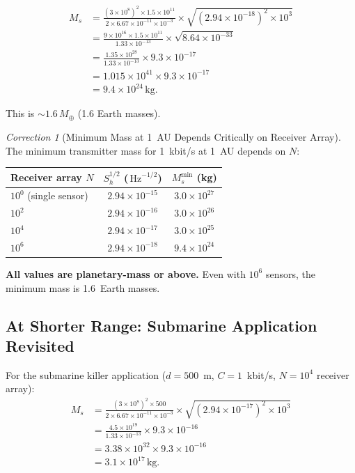 \documentclass[11pt]{article}
\theoremstyle{definition}
\theoremstyle{remark}
\newtheorem{correction}[theorem]{Correction}
\newcommand{\ee}[1]{\times10^{#1}}
\newcommand{\sqrtHz}{\,\mathrm{Hz}^{-1/2}}
\begin{document}
\begin{align}
M_s &= \frac{(3\ee{8})^2 \times 1.5\ee{11}}{2 \times 6.67\ee{-11} \times 10^{-3}}
\times \sqrt{(2.94\ee{-18})^2 \times 10^3} \nonumber\\
&= \frac{9\ee{16} \times 1.5\ee{11}}{1.33\ee{-13}}
\times \sqrt{8.64\ee{-33}} \nonumber\\
&= \frac{1.35\ee{28}}{1.33\ee{-13}}
\times 9.3\ee{-17} \nonumber\\
&= 1.015\ee{41} \times 9.3\ee{-17} \nonumber\\
&= 9.4\ee{24}\,\mathrm{kg}.
\label{eq:M-min-numerical}
\end{align}

This is $\sim 1.6\,M_\oplus$ (1.6 Earth masses).

\begin{correction}[Minimum Mass at 1~AU Depends Critically on Receiver Array]
\label{corr:mass-1AU}
The minimum transmitter mass for 1~kbit/s at 1~AU depends on $N$:

\begin{center}
\begin{tabular}{@{}lcc@{}}
\toprule
Receiver array $N$ & $S_h^{1/2}$ ($\sqrtHz$) & $M_s^{\min}$ (kg) \\
\midrule
$10^0$ (single sensor) & $2.94\ee{-15}$ & $3.0\ee{27}$ \\
$10^2$ & $2.94\ee{-16}$ & $3.0\ee{26}$ \\
$10^4$ & $2.94\ee{-17}$ & $3.0\ee{25}$ \\
$10^6$ & $2.94\ee{-18}$ & $9.4\ee{24}$ \\
\bottomrule
\end{tabular}
\end{center}

\textbf{All values are planetary-mass or above.} Even with $10^6$ sensors,
the minimum mass is 1.6~Earth masses.
\end{correction}

\subsection{At Shorter Range: Submarine Application Revisited}

For the submarine killer application ($d = 500$~m, $C = 1$~kbit/s,
$N = 10^4$ receiver array):
\begin{align}
M_s &= \frac{(3\ee{8})^2 \times 500}{2 \times 6.67\ee{-11} \times 10^{-3}}
\times \sqrt{(2.94\ee{-17})^2 \times 10^3} \nonumber\\
&= \frac{4.5\ee{19}}{1.33\ee{-13}} \times 9.3\ee{-16} \nonumber\\
&= 3.38\ee{32} \times 9.3\ee{-16} \nonumber\\
&= 3.1\ee{17}\,\mathrm{kg}.
\label{eq:M-sub-corrected}
\end{align}
\end{document}
